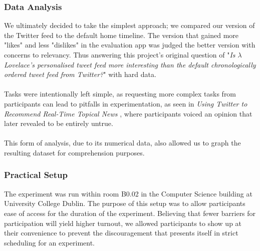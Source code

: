 \documentclass{article}
\begin{document}

\subsubsection*{Data Analysis} %
We ultimately decided to take the simplest approach; we compared our version of the Twitter feed to the default home timeline. The version that gained more "likes" and less "dislikes" in the evaluation app was judged the better version with concerns to relevancy. Thus answering this project's original question of "\textit{Is $\lambda$ Lovelace's personalised tweet feed more interesting than the default chronologically ordered tweet feed from Twitter?}" with hard data.
\\\\

Tasks were intentionally left simple, as requesting more complex tasks from participants can lead to pitfalls in experimentation, as seen in \textit{Using Twitter to Recommend Real-Time Topical News} \cite{paper3}, where participants voiced an opinion that later revealed to be entirely untrue.
\\\\
This form of analysis, due to its numerical data, also allowed us to graph the resulting dataset for comprehension purposes. 

\subsubsection*{Practical Setup} %
The experiment was run within room B0.02 in the Computer Science building at University College Dublin. The purpose of this setup was to allow participants ease of access for the duration of the experiment. Believing that fewer barriers for participation will yield higher turnout, we allowed participants to show up at their convenience to prevent the discouragement that presents itself in strict scheduling for an experiment. 
\end{document}
